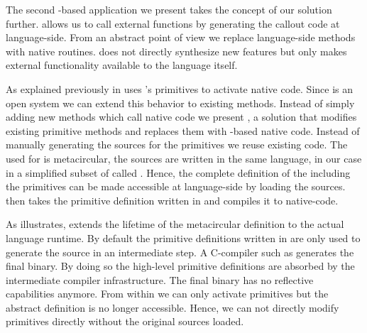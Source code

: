 \noindent The second \B-based application we present takes the concept of our \FFI solution further.
\NB allows us to call external functions by generating the callout code at language-side.
From an abstract point of view we replace language-side methods with native routines.
\NB does not directly synthesize new features but only makes external functionality available to the language itself.

As explained previously in  \B uses \PH's primitives to activate native code.
Since \PH is an open system we can extend this behavior to existing methods.
Instead of simply adding new methods which call native code we present \WF, a solution that modifies existing primitive methods and replaces them with \B-based native code.
Instead of manually generating the sources for the primitives we reuse existing code.
The \VM used for \PH is metacircular, the \VM sources are written in the same language, in our case in a simplified subset of \PH called \Slang.
Hence, the complete definition of the \VM including the primitives can be made accessible at language-side by loading the \VM sources.
\WF then takes the primitive definition written in \Slang and compiles it to native-code.

As  illustrates, \WF extends the lifetime of the metacircular \VM definition to the actual language runtime.
By default the primitive definitions written in \Slang are only used to generate the \VM source in an intermediate step.
A C-compiler such as \GCC generates the final binary.
By doing so the high-level primitive definitions are absorbed by the intermediate compiler infrastructure.
The final binary has no reflective capabilities anymore.
From within \PH we can only activate primitives but the abstract definition is no longer accessible.
Hence, we can not directly modify primitives directly without the original \VM sources loaded.

